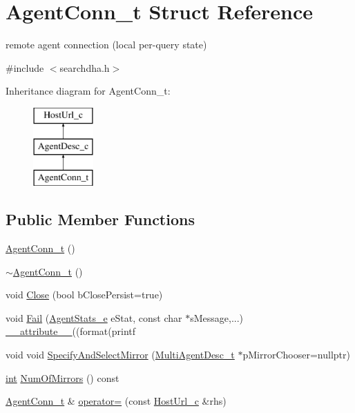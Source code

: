\hypertarget{structAgentConn__t}{\section{Agent\-Conn\-\_\-t Struct Reference}
\label{structAgentConn__t}
}


remote agent connection (local per-\/query state)  




{\ttfamily \#include $<$searchdha.\-h$>$}

Inheritance diagram for Agent\-Conn\-\_\-t\-:\begin{figure}[H]
\begin{center}
\leavevmode
\includegraphics[height=3.000000cm]{structAgentConn__t}
\end{center}
\end{figure}
\subsection*{Public Member Functions}
\begin{DoxyCompactItemize}
\item 
\hyperlink{structAgentConn__t_af3e2cf976f977bdca921a5286eb9796c}{Agent\-Conn\-\_\-t} ()
\item 
\hyperlink{structAgentConn__t_afba48527a33db4220c9fdf2b1bb8a81d}{$\sim$\-Agent\-Conn\-\_\-t} ()
\item 
void \hyperlink{structAgentConn__t_a48035eccaae9a0d5de1a91e378e4548e}{Close} (bool b\-Close\-Persist=true)
\item 
void \hyperlink{structAgentConn__t_a8c67e1a26d34f157e61e3fc96ad4d2da}{Fail} (\hyperlink{searchdha_8h_af72fe71e6601be343fec3a3111ba7ebb}{Agent\-Stats\-\_\-e} e\-Stat, const char $\ast$s\-Message,...) \hyperlink{sphinxstd_8h_a9d373a9b65ff25b2db84c07394e1c212}{\-\_\-\-\_\-attribute\-\_\-\-\_\-}((format(printf
\item 
void void \hyperlink{structAgentConn__t_a1b0ad66924cff4c6797b6dc10503c1fe}{Specify\-And\-Select\-Mirror} (\hyperlink{structMultiAgentDesc__t}{Multi\-Agent\-Desc\-\_\-t} $\ast$p\-Mirror\-Chooser=nullptr)
\item 
\hyperlink{sphinxexpr_8cpp_a4a26e8f9cb8b736e0c4cbf4d16de985e}{int} \hyperlink{structAgentConn__t_ac167c632a1c884cdce0958d0965b37ee}{Num\-Of\-Mirrors} () const 
\item 
\hyperlink{structAgentConn__t}{Agent\-Conn\-\_\-t} \& \hyperlink{structAgentConn__t_a3103763aece77f0474dac4b0e96c7a38}{operator=} (const \hyperlink{classHostUrl__c}{Host\-Url\-\_\-c} \&rhs)
\end{DoxyCompactItemize}
